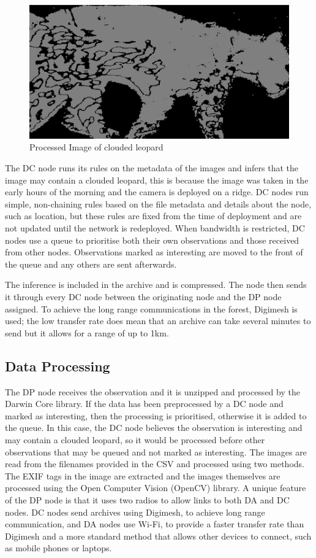 			\begin{figure}[!t]
			\centering
			\includegraphics[width=\textwidth]{Chap4/figures/leopard_proc}
			\caption{Processed Image of clouded leopard}
			\label{clproc}
			\end{figure}
			
			The DC node runs its rules on the metadata of the images and infers that the image may contain a clouded leopard, this is because the image was taken in the early hours of the morning and the camera is deployed on a ridge. DC nodes run simple, non-chaining rules based on the file metadata and details about the node, such as location, but these rules are fixed from the time of deployment and are not updated until the network is redeployed. When bandwidth is restricted, DC nodes use a queue to prioritise both their own observations and those received from other nodes. Observations marked as interesting are moved to the front of the queue and any others are sent afterwards.
			
			The inference is included in the archive and is compressed. The node then sends it through every DC node between the originating node and the DP node assigned. To achieve the long range communications in the forest, Digimesh is used; the low transfer rate does mean that an archive can take several minutes to send but it allows for a range of up to 1km.

	\subsection{Data Processing}			
			The DP node receives the observation and it is unzipped and processed by the Darwin Core library. If the data has been preprocessed by a DC node and marked as interesting, then the processing is prioritised, otherwise it is added to the queue. In this case, the DC node believes the observation is interesting and may contain a clouded leopard, so it would be processed before other observations that may be queued and not marked as interesting. The images are read from the filenames provided in the CSV and processed using two methods. The EXIF tags in the image are extracted and the images themselves are processed using the Open Computer Vision (OpenCV) library. A unique feature of the DP node is that it uses two radios to allow links to both DA and DC nodes. DC nodes send archives using Digimesh, to achieve long range communication, and DA nodes use Wi-Fi, to provide a faster transfer rate than Digimesh and a more standard method that allows other devices to connect, such as mobile phones or laptops.
			
